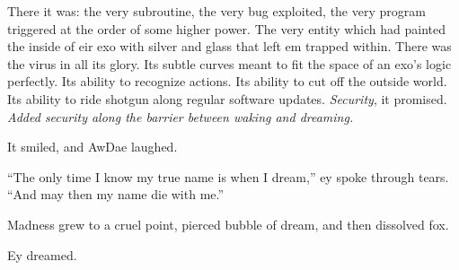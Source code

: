 There it was: the very subroutine, the very bug exploited, the very program triggered at the order of some higher power. The very entity which had painted the inside of eir exo with silver and glass that left em trapped within. There was the virus in all its glory. Its subtle curves meant to fit the space of an exo's logic perfectly. Its ability to recognize actions. Its ability to cut off the outside world. Its ability to ride shotgun along regular software updates. \emph{Security}, it promised. \emph{Added security along the barrier between waking and dreaming.}

It smiled, and AwDae laughed.

``The only time I know my true name is when I dream,'' ey spoke through tears. ``And may then my name die with me.''

Madness grew to a cruel point, pierced bubble of dream, and then dissolved fox.

Ey dreamed.
